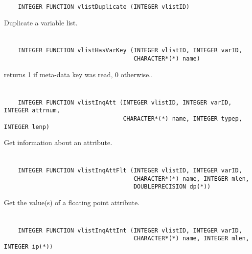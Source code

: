 \begin{verbatim}
    INTEGER FUNCTION vlistDuplicate (INTEGER vlistID)
\end{verbatim}

Duplicate a variable list.


\section*{\tt {}}

\begin{verbatim}
    INTEGER FUNCTION vlistHasVarKey (INTEGER vlistID, INTEGER varID,
                                     CHARACTER*(*) name)
\end{verbatim}

returns 1 if meta-data key was read, 0 otherwise..


\section*{\tt {}}

\begin{verbatim}
    INTEGER FUNCTION vlistInqAtt (INTEGER vlistID, INTEGER varID, INTEGER attrnum,
                                  CHARACTER*(*) name, INTEGER typep, INTEGER lenp)
\end{verbatim}

Get information about an attribute.


\section*{\tt {}}

\begin{verbatim}
    INTEGER FUNCTION vlistInqAttFlt (INTEGER vlistID, INTEGER varID,
                                     CHARACTER*(*) name, INTEGER mlen,
                                     DOUBLEPRECISION dp(*))
\end{verbatim}

Get the value(s) of a floating point attribute.


\section*{\tt {}}

\begin{verbatim}
    INTEGER FUNCTION vlistInqAttInt (INTEGER vlistID, INTEGER varID,
                                     CHARACTER*(*) name, INTEGER mlen, INTEGER ip(*))
\end{verbatim}

